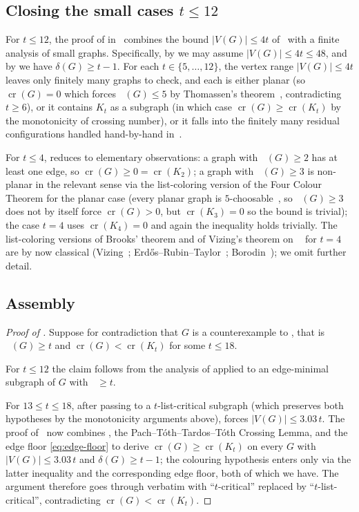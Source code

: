 \documentclass[11pt,a4paper]{article}
\theoremstyle{definition}
\DeclareMathOperator{\crN}{cr}
\DeclareMathOperator{\chl}{\chi_{\ell}}
\begin{document}
\subsection{Closing the small cases $t \le 12$}\label{ssec:small-cases}

For $t \le 12$, the proof of  in~\cite{ACF}
combines the bound $|V(G)| \le 4t$ of~ with a
finite analysis of small graphs. Specifically, by
 we may assume $|V(G)| \le 4t \le 48$, and by
 we have $\delta(G) \ge t - 1$. For each
$t \in \{5, \dots, 12\}$, the vertex range $|V(G)| \le 4t$ leaves
only finitely many graphs to check, and each is either planar
(so $\crN(G) = 0$ which forces $\chl(G) \le 5$ by Thomassen's
theorem~\cite{Thomassen}, contradicting $t \ge 6$), or it contains
$K_t$ as a subgraph (in which case $\crN(G) \ge \crN(K_t)$ by the
monotonicity of crossing number), or it falls into the finitely
many residual configurations handled hand-by-hand in~\cite{ACF}.

For $t \le 4$,  reduces to elementary
observations: a graph with $\chl(G) \ge 2$ has at least one edge,
so $\crN(G) \ge 0 = \crN(K_2)$; a graph with $\chl(G) \ge 3$ is
non-planar in the relevant sense via the list-coloring version of
the Four Colour Theorem for the planar case (every planar graph is
$5$-choosable~\cite{Thomassen}, so $\chl(G) \ge 3$ does not by
itself force $\crN(G) > 0$, but $\crN(K_3) = 0$ so the bound is
trivial); the case $t = 4$ uses $\crN(K_4) = 0$ and again the
inequality holds trivially. The list-coloring versions of Brooks'
theorem and of Vizing's theorem on $\chl$ for $t = 4$ are by now
classical (Vizing~\cite{Vizing}; Erd\H{o}s--Rubin--Taylor~\cite{ERT};
Borodin~\cite{Borodin1977}); we omit further detail.

\subsection{Assembly}

\begin{proof}[Proof of ]
Suppose for contradiction that $G$ is a counterexample to
, that is $\chl(G) \ge t$ and
$\crN(G) < \crN(K_t)$ for some $t \le 18$.

For $t \le 12$ the claim follows from the analysis of
 applied to an edge-minimal subgraph of $G$
with $\chl \ge t$.

For $13 \le t \le 18$, after passing to a $t$-list-critical
subgraph (which preserves both hypotheses by the monotonicity
arguments above),  forces $|V(G)| \le
3.03\,t$. The proof of~\cite[Theorem~1]{Ackerman} now combines
, the Pach--T\'oth--Tardos--T\'oth Crossing
Lemma, and the edge floor \eqref{eq:edge-floor} to derive
$\crN(G) \ge \crN(K_t)$ on every $G$ with $|V(G)| \le 3.03\,t$ and
$\delta(G) \ge t - 1$; the colouring hypothesis enters only via
the latter inequality and the corresponding edge floor, both of
which we have. The argument therefore goes through verbatim with
``$t$-critical'' replaced by ``$t$-list-critical'', contradicting
$\crN(G) < \crN(K_t)$.
\end{proof}
\end{document}
